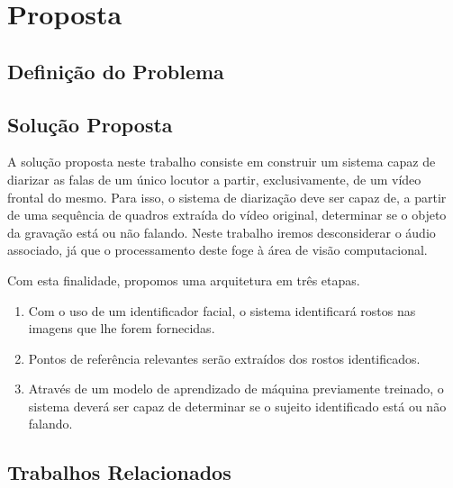 \chapter{Proposta}
\label{ch:proposal}

\section{Definição do Problema}
\label{sec:problem-desc}

\section{Solução Proposta}
\label{sec:proposed-solution}

A solução proposta neste trabalho consiste em construir um sistema capaz de diarizar as falas de um único locutor a partir, exclusivamente, de um vídeo frontal do mesmo. Para isso, o sistema de diarização deve ser capaz de, a partir de uma sequência de quadros extraída do vídeo original, determinar se o objeto da gravação está ou não falando. Neste trabalho iremos desconsiderar o áudio associado, já que o processamento deste foge à área de visão computacional.

Com esta finalidade, propomos uma arquitetura em três etapas. 
\begin{enumerate}
    \item Com o uso de um identificador facial, o sistema identificará rostos nas imagens que lhe forem fornecidas. 
    \item Pontos de referência relevantes serão extraídos dos rostos identificados. 
    \item Através de um modelo de aprendizado de máquina previamente treinado, o sistema deverá ser capaz de determinar se o sujeito identificado está ou não falando.
\end{enumerate}

\section{Trabalhos Relacionados}
\label{sec:related-work}
